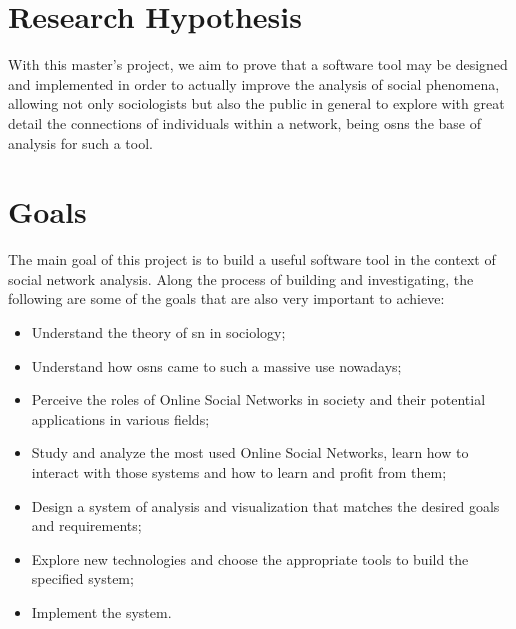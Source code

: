 \section{Research Hypothesis}
With this master's project, we aim to prove that a software tool may be designed and implemented in order to actually improve the analysis of social phenomena, allowing not only sociologists but also the public in general to explore with great
detail the connections of individuals within a network, being \glspl{osn} the base of analysis for such a tool.

\section{Goals}

The main goal of this project is to build a useful software tool in the context of social network analysis. Along the process of building and investigating, the following are some of the goals that are also very important to achieve:

\begin{itemize}
\item Understand the theory of \gls{sn} in sociology;
\item Understand how \glspl{osn} came to such a massive use nowadays;
\item Perceive the roles of Online Social Networks in society and their potential applications in various fields;
\item Study and analyze the most used Online Social Networks, learn how to interact with those systems and how to learn and profit from them;
\item Design a system of analysis and visualization that matches the desired goals and requirements;
\item Explore new technologies and choose the appropriate tools to build the specified system;
\item Implement the system.
\end{itemize}

